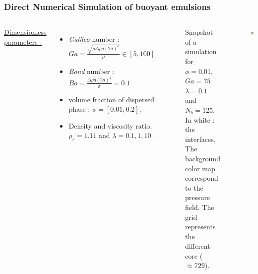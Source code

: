 \documentclass{sintefbeamer}
\begin{document}
\begin{frame}
  \frametitle{Direct Numerical Simulation of buoyant emulsions}
  \begin{columns}
  \underline{Dimensionless parameters :} 
  \begin{itemize}
    \item \textit{Galileo} number : $Ga =\frac{\sqrt{\rho \Delta\rho g(2a)^3}}{\mu} \in [5, 100]$
    \item \textit{Bond} number : $Bo = \frac{\Delta \rho g (2a)^2}{\sigma} = 0.1$ 
    \item volume fraction of dispersed phase : $\phi = [0.01;0.2]$. 
    \item Density and viscosity ratio, $\rho_r=1.11$ and $\lambda= 0.1, 1, 10$. 
  \end{itemize}
  
  \begin{figure}
    \caption{Snapshot of a simulation for $\phi = 0.01$, $Ga = 75$ $\lambda = 0.1$ and $N_b = 125$. In white : the interfaces, The background color map correspond to the pressure field. The grid represents the different core ($\approx 729$).
    }
  \end{figure}
  \centering
  \includegraphics[width =  1.1\textwidth]{image/PHI_01_Ga_75.png}
  \end{columns}
\end{frame}
\end{document}
